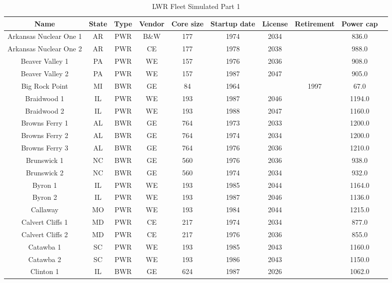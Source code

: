 \begin{table}[!h]
    \centering
    \caption{LWR Fleet Simulated Part 1}
    \label{tab:lwr_fleet_1}
    \begin{tabular}{c c c c c c c c c c}
    \hline
    \textbf{Name} & \textbf{State} & \textbf{Type} & \textbf{Vendor} & \textbf{Core size} & \textbf{Startup date} & \textbf{License} & \textbf{Retirement} & \textbf{Power cap} \\
    \hline
    Arkansas Nuclear One 1 & AR & PWR & B\&W & 177 & 1974 & 2034 &  & 836.0 \\
    Arkansas Nuclear One 2 & AR & PWR & CE & 177 & 1978 & 2038 &  & 988.0 \\
    Beaver Valley 1 & PA & PWR & WE & 157 & 1976 & 2036 &  & 908.0 \\
    Beaver Valley 2 & PA & PWR & WE & 157 & 1987 & 2047 &  & 905.0 \\
    Big Rock Point & MI & BWR & GE & 84 & 1964 &  & 1997 & 67.0 \\
    Braidwood 1 & IL & PWR & WE & 193 & 1987 & 2046 &  & 1194.0 \\
    Braidwood 2 & IL & PWR & WE & 193 & 1988 & 2047 &  & 1160.0 \\
    Browns Ferry 1 & AL & BWR & GE & 764 & 1973 & 2033 &  & 1200.0 \\
    Browns Ferry 2 & AL & BWR & GE & 764 & 1974 & 2034 &  & 1200.0 \\
    Browns Ferry 3 & AL & BWR & GE & 764 & 1976 & 2036 &  & 1210.0 \\
    Brunswick 1 & NC & BWR & GE & 560 & 1976 & 2036 &  & 938.0 \\
    Brunswick 2 & NC & BWR & GE & 560 & 1974 & 2034 &  & 932.0 \\
    Byron 1 & IL & PWR & WE & 193 & 1985 & 2044 &  & 1164.0 \\
    Byron 2 & IL & PWR & WE & 193 & 1987 & 2046 &  & 1136.0 \\
    Callaway & MO & PWR & WE & 193 & 1984 & 2044 &  & 1215.0 \\
    Calvert Cliffs 1 & MD & PWR & CE & 217 & 1974 & 2034 &  & 877.0 \\
    Calvert Cliffs 2 & MD & PWR & CE & 217 & 1976 & 2036 &  & 855.0 \\
    Catawba 1 & SC & PWR & WE & 193 & 1985 & 2043 &  & 1160.0 \\
    Catawba 2 & SC & PWR & WE & 193 & 1986 & 2043 &  & 1150.0 \\
    Clinton 1 & IL & BWR & GE & 624 & 1987 & 2026 &  & 1062.0 \\

\end{tabular}
\end{table}
